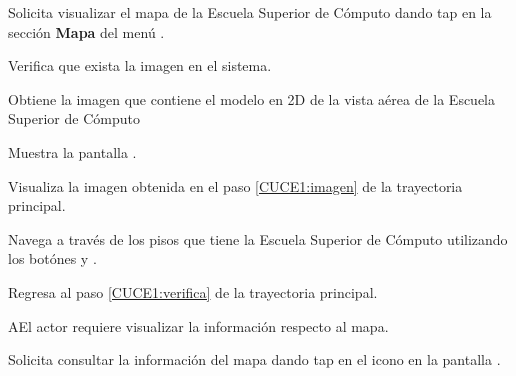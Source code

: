 \begin{UCtrayectoria}
	
	\UCpaso[\UCactor] Solicita visualizar el mapa de la Escuela Superior de Cómputo dando tap en la sección \textbf{Mapa} del menú  .
	
	\UCpaso [\UCsist] \label{CUCE1:verifica} Verifica que exista la imagen en el sistema. 
	
	\UCpaso [\UCsist] \label{CUCE1:imagen} Obtiene la imagen que contiene el modelo en 2D de la vista aérea de la Escuela Superior de Cómputo
	
	\UCpaso[\UCsist] Muestra la pantalla .
	
	\UCpaso [\UCactor] Visualiza la imagen obtenida en el paso \ref{CUCE1:imagen} de la trayectoria principal. 
	
	\UCpaso [\UCactor] Navega a través de los pisos que tiene la Escuela Superior de Cómputo utilizando los botónes \btnArriba{} y \btnAbajo{}. 
	
	\UCpaso [\UCsist] Regresa al paso \ref{CUCE1:verifica} de la trayectoria principal.
	
\end{UCtrayectoria}

\begin{UCtrayectoriaA}{A}{El actor requiere visualizar la información respecto al mapa.}
	
	\UCpaso [\UCactor] \label{CUCE1:informacion} Solicita consultar la información del mapa dando tap en el icono \btnInfo{} en la pantalla . 
	
\end{UCtrayectoriaA}

